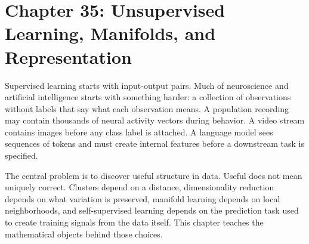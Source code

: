 \section{Chapter 35: Unsupervised Learning, Manifolds, and Representation}
\label{ch:unsupervised-learning-manifolds-representation}

Supervised learning starts with input-output pairs. Much of neuroscience and artificial intelligence starts with something harder: a collection of observations without labels that say what each observation means. A population recording may contain thousands of neural activity vectors during behavior. A video stream contains images before any class label is attached. A language model sees sequences of tokens and must create internal features before a downstream task is specified.

The central problem is to discover useful structure in data. Useful does not mean uniquely correct. Clusters depend on a distance, dimensionality reduction depends on what variation is preserved, manifold learning depends on local neighborhoods, and self-supervised learning depends on the prediction task used to create training signals from the data itself. This chapter teaches the mathematical objects behind those choices.

